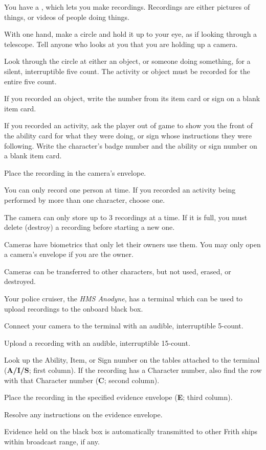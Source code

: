 \documentclass[green]{guildcamp4}
\begin{document}
\name{\gEvidence{}}

You have a \iVideoCamera{\MYname}, which lets you make recordings. Recordings are either pictures of things, or videos of people doing things. 
	
\begin{enum}
    \item With one hand, make a circle and hold it up to your eye, as if looking through a telescope. Tell anyone who looks at you that you are holding up a camera.
    \item Look through the circle at either an object, or someone doing something, for a silent, interruptible five count. The activity or object must be recorded for the entire five count.
    \item If you recorded an object, write the number from its item card or sign on a blank item card.
    \item If you recorded an activity, ask the player out of game to show you the front of the ability card for what they were doing, or sign whose instructions they were following. Write the character's badge number and the ability or sign number on a blank item card.
    \item Place the recording in the camera's envelope.
\end{enum}

\begin{itemz}[Notes]
	\item You can only record one person at time. If you recorded an activity being performed by more than one character, choose one.
	\item The camera can only store up to 3 recordings at a time. If it is full, you must delete (destroy) a recording before starting a new one. 
	\item Cameras have biometrics that only let their owners use them. You may only open a camera's envelope if you are the owner.
	\item Cameras can be transferred to other characters, but not used, erased, or destroyed. 
\end{itemz}
    
Your police cruiser, the \emph{HMS Anodyne}, has a terminal which can be used to upload recordings to the onboard black box.

\begin{enum}
	\item Connect your camera to the terminal with an audible, interruptible 5-count.
    \item Upload a recording with an audible, interruptible 15-count.
    \item Look up the Ability, Item, or Sign number on the tables attached to the terminal ({\bf A/I/S}; first column). If the recording has a Character number, also find the row with that Character number ({\bf C}; second column).
    \item Place the recording in the specified evidence envelope ({\bf E}; third column).
    \item Resolve any instructions on the evidence envelope.
\end{enum}

\begin{itemz}[Notes]
	\item Evidence held on the black box is automatically transmitted to other Frith ships within broadcast range, if any.
\end{itemz}
\end{document}
